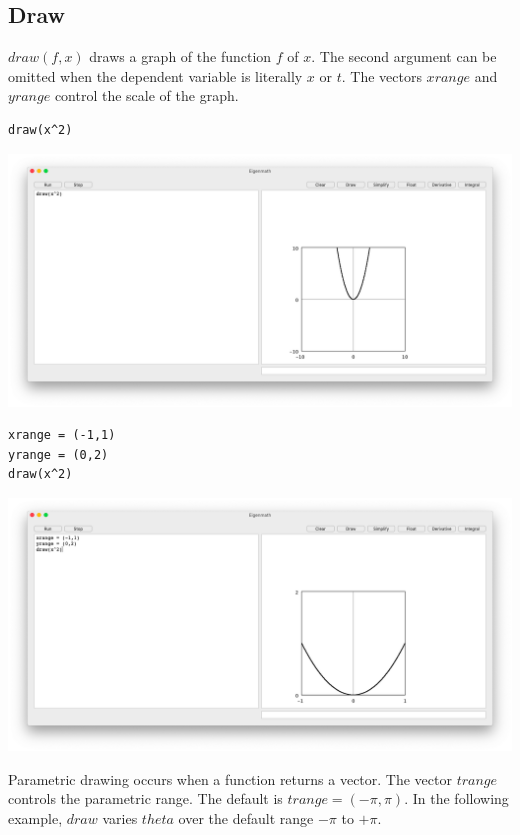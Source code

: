 
\subsection{Draw}
$draw(f,x)$ draws a graph of the function $f$ of $x$.
The second argument can be omitted when the dependent variable
is literally $x$ or $t$.
The vectors $xrange$ and $yrange$ control the scale of the graph.

\begin{Verbatim}[formatcom=\color{blue}]
draw(x^2)
\end{Verbatim}

\begin{center}
\includegraphics[scale=0.2]{parabola.png}
\end{center}

\begin{Verbatim}[formatcom=\color{blue},samepage=true]
xrange = (-1,1)
yrange = (0,2)
draw(x^2)
\end{Verbatim}

\begin{center}
\includegraphics[scale=0.2]{parabola2.png}
\end{center}

Parametric drawing occurs when a function returns a vector.
The vector $trange$ controls the parametric range.
The default is $trange=(-\pi,\pi)$.
In the following example, $draw$ varies $theta$
over the default range $-\pi$ to $+\pi$.

